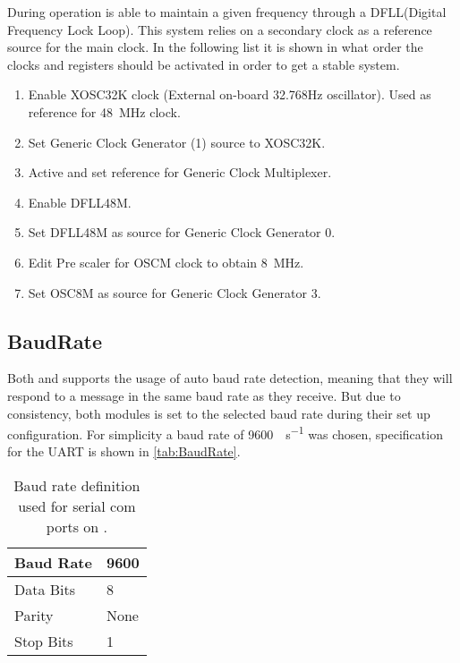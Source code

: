 During operation \SAMD is able to maintain a given frequency through a DFLL(Digital Frequency Lock Loop).
This system relies on a secondary clock as a reference source for the main clock.
In the following list it is shown in what order the clocks and registers should be activated in order to get a stable system.

\begin{enumerate}
	\item Enable XOSC32K clock (External on-board 32.768Hz oscillator). Used as reference for \SI{48}{\mega\hertz} clock.
	\item Set Generic Clock Generator (1) source to XOSC32K.
	\item Active and set reference for Generic Clock Multiplexer.
	\item Enable DFLL48M.
	\item Set DFLL48M as source for Generic Clock Generator 0.
	\item Edit Pre scaler for OSCM clock to obtain \SI{8}{\mega\hertz}.
	\item Set OSC8M as source for Generic Clock Generator 3.
\end{enumerate} 

\subsection{BaudRate}
Both \SARA and \GPS supports the usage of auto baud rate detection, meaning that they will respond to a message in the same baud rate as they receive.
But due to consistency, both modules is set to the selected baud rate during their set up configuration. 
For simplicity a baud rate of \SI[per-mode = symbol]{9600}{\bit\per\second} was chosen, specification for the UART is shown in \vref{tab:BaudRate}.

\begin{table}[H]
	\begin{tabular}{ll}
		\hline 
		Baud Rate & 9600 \\ 
		\hline 
		Data Bits & 8 \\ 
		\hline 
		Parity & None \\ 
		\hline 
		Stop Bits & 1 \\ 
		\hline 
	\end{tabular}
	\centering
	\caption{Baud rate definition used for serial com ports on \SAMD.}
	\label{tab:BaudRate}
\end{table} 

\FloatBarrier